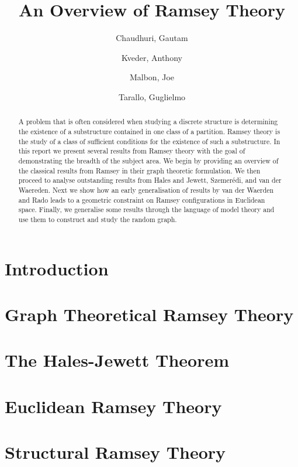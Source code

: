 \documentclass{article}
\title{An Overview of Ramsey Theory}
\author{
  Chaudhuri, Gautam\\
  \and
  Kveder, Anthony\\
  \and
  Malbon, Joe\\
  \and
  Tarallo, Guglielmo\\
}
\theoremstyle{BreakBold}
\theoremstyle{example}
\begin{document}
\begin{titlingpage}
\maketitle
\begin{abstract}
  A problem that is often considered when studying a discrete structure is
  determining the existence of a substructure contained in one class of a partition.
  Ramsey theory is the study of a class of sufficient conditions for the
  existence of such a substructure.
  In this report we present several results from Ramsey theory with the goal of
  demonstrating the breadth of the subject area.
  We begin by providing an overview of the classical results from Ramsey in
  their graph theoretic formulation.
  We then proceed to analyse outstanding results from Hales and Jewett, Szemerédi,
  and van der Waereden.
  Next we show how an early generalisation of results by van der Waerden and
  Rado leads to a geometric constraint on Ramsey configurations in Euclidean
  space.
  Finally, we generalise some results through the language of model theory and
  use them to construct and study the random graph.
\end{abstract}
\tableofcontents
  
\end{titlingpage}

\section*{Introduction}
\label{sec:0}


\section{Graph Theoretical Ramsey Theory}
\label{sec:1}


\section{The Hales-Jewett Theorem}
\label{sec:2}

\newpage
\section{Euclidean Ramsey Theory}
\label{sec:4}


\newpage
\section{Structural Ramsey Theory}
\label{sec:4}


\printbibliography
\end{document}
